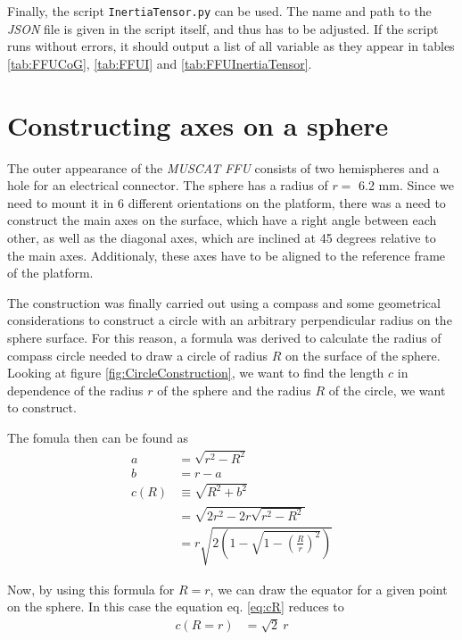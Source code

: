 \documentclass[journal]{IEEEtran}
\begin{document}
Finally, the script \texttt{InertiaTensor.py} can be used. The name and path to the \emph{JSON} file is given in the script itself, and thus has to be adjusted.
If the script runs without errors, it should output a list of all variable as they appear in tables \ref{tab:FFUCoG}, \ref{tab:FFUI} and \ref{tab:FFUInertiaTensor}.


\clearpage
\section{Constructing axes on a sphere}
\label{seq:ConstructAxes}

The outer appearance of the \emph{MUSCAT FFU} consists of two hemispheres and a hole for an electrical connector. The sphere has a radius of $r =$ 6.2 mm.
Since we need to mount it in 6 different orientations on the platform, there was a need to construct the main axes on the surface, which have a right angle between each other, as well as the diagonal axes, which are inclined at 45 degrees relative to the main axes.
Additionaly, these axes have to be aligned to the reference frame of the platform.

The construction was finally carried out using a compass and some geometrical considerations to construct a circle with an arbitrary perpendicular radius on the sphere surface.
For this reason, a formula was derived to calculate the radius of compass circle needed to draw a circle of radius $R$ on the surface of the sphere.
Looking at figure \ref{fig:CircleConstruction}, we want to find the length $c$ in dependence of the radius $r$ of the sphere and the radius $R$ of the circle, we want to construct.

The fomula then can be found as
\begin{align}
	a & = \sqrt{r^2 - R^2} \\
	b & = r - a \\
	c(R) & \equiv \sqrt{R^2 + b^2}\\
	& = \sqrt{2r^2 - 2r \sqrt{r^2 - R^2}} \\
	& = r \sqrt{2 \left(  1 - \sqrt{1 - \left( \frac{R}{r} \right)^2 } \right)}
	\label{eq:cR}
\end{align}

Now, by using this formula for $R = r$, we can draw the equator for a given point on the sphere.
In this case the equation eq. \eqref{eq:cR} reduces to
\begin{align}
	c(R=r) & = \sqrt{2}~r
\end{align}
\end{document}
